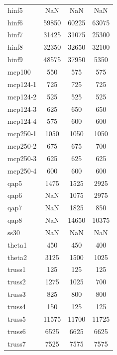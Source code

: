 \begin{longtable}{lccc}
hinf5    &      NaN &      NaN &      NaN \\
hinf6    &    59850 &    60225 &    63075 \\
hinf7    &    31425 &    31075 &    25300 \\
hinf8    &    32350 &    32650 &    32100 \\
hinf9    &    48575 &    37950 &     5350 \\
mcp100   &      550 &      575 &      575 \\
mcp124-1 &      725 &      725 &      725 \\
mcp124-2 &      525 &      525 &      525 \\
mcp124-3 &      625 &      650 &      650 \\
mcp124-4 &      575 &      600 &      600 \\
mcp250-1 &     1050 &     1050 &     1050 \\
mcp250-2 &      675 &      675 &      700 \\
mcp250-3 &      625 &      625 &      625 \\
mcp250-4 &      600 &      600 &      600 \\
qap5     &     1475 &     1525 &     2925 \\
qap6     &      NaN &     1075 &     2975 \\
qap7     &      NaN &     1825 &      850 \\
qap8     &      NaN &    14650 &    10375 \\
ss30     &      NaN &      NaN &      NaN \\
theta1   &      450 &      450 &      400 \\
theta2   &     3125 &     1500 &     1025 \\
truss1   &      125 &      125 &      125 \\
truss2   &     1275 &     1025 &      700 \\
truss3   &      825 &      800 &      800 \\
truss4   &      150 &      125 &      125 \\
truss5   &    11575 &    11700 &    11725 \\
truss6   &     6525 &     6625 &     6625 \\
truss7   &     7525 &     7575 &     7575 \\
\end{longtable}
